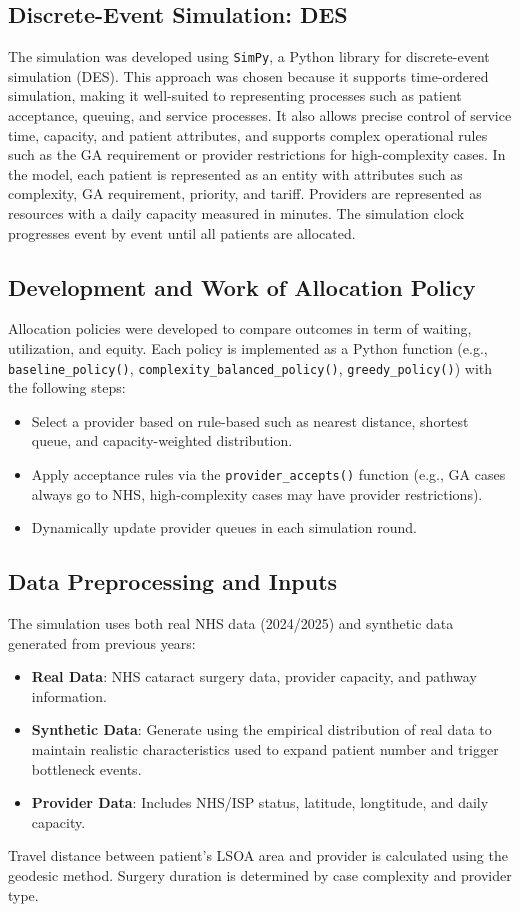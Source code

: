 \documentclass[ %
                    author={Nattanan Nawakitbamrung},
                supervisor={Dr. Sébastien Rochat},
                    degree={MSc},
                     title={Developing and Evaluating the Impact of a Single Patient Treatment List (PTL) for an NHS Integrated Care System},
                  subtitle={},
                      type={},
                      year={2025}]{dissertation}
\begin{document}
\subsection{Discrete-Event Simulation: DES}
The simulation was developed using \texttt{SimPy}, a Python library for discrete-event simulation (DES). This approach was chosen because it supports time-ordered simulation, making it well-suited to representing processes such as patient acceptance, queuing, and service processes. It also allows precise control of service time, capacity, and patient attributes, and supports complex operational rules such as the GA requirement or provider restrictions for high-complexity cases. In the model, each patient is represented as an entity with attributes such as complexity, GA requirement, priority, and tariff. Providers are represented as resources with a daily capacity measured in minutes. The simulation clock progresses event by event until all patients are allocated.

\subsection{Development and Work of Allocation Policy}
Allocation policies were developed to compare outcomes in term of waiting, utilization, and equity. Each policy is implemented as a Python function (e.g., \texttt{baseline\_policy()}, \texttt{complexity\_balanced\_policy()}, \texttt{greedy\_policy()}) with the following steps:
\begin{itemize}
    \item Select a provider based on rule-based such as nearest distance, shortest queue, and capacity-weighted distribution. 
    \item Apply acceptance rules via the \texttt{provider\_accepts()} function (e.g., GA cases always go to NHS, high-complexity cases may have provider restrictions).
    \item Dynamically update provider queues in each simulation round.
\end{itemize}

\subsection{Data Preprocessing and Inputs}
The simulation uses both real NHS data (2024/2025) and synthetic data generated from previous years: 
\begin{itemize}
    \item \textbf{Real Data}: NHS cataract surgery data, provider capacity, and pathway information. 
    \item \textbf{Synthetic Data}: Generate using the empirical distribution of real data to maintain realistic characteristics used to expand patient number and trigger bottleneck events.
    \item \textbf{Provider Data}: Includes NHS/ISP status, latitude, longtitude, and daily capacity.
\end{itemize}
Travel distance between patient's LSOA area and provider is calculated using the geodesic method. Surgery duration is determined by case complexity and provider type.
\end{document}
